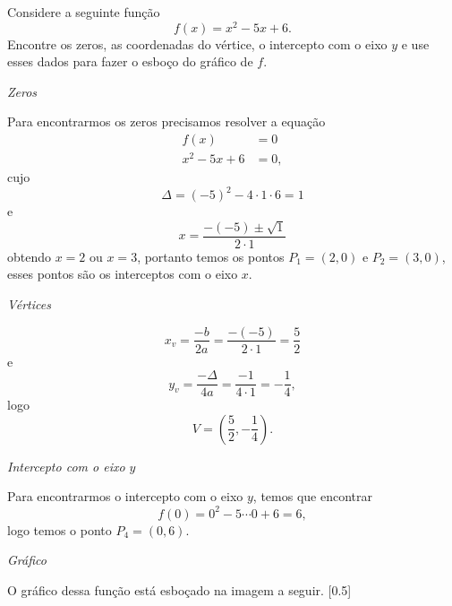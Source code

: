 \begin{example}
  Considere a seguinte função
  \[
    f(x)=x^2-5x+6.
  \]
  Encontre os zeros, as coordenadas do vértice, o intercepto com o eixo $y$
  e use esses dados para fazer o esboço do gráfico de $f$.

  \solution
  \emph{Zeros}

  Para encontrarmos os zeros precisamos resolver a equação
  \begin{align*}
    f(x) & =0 \\
    x^2-5x+6 & = 0,
  \end{align*}
  cujo
  \[
    \Delta = (-5)^2 - 4 \cdot 1 \cdot 6 = 1
  \]
  e
  \[
    x = \frac{-(-5) \pm \sqrt{1}}{2 \cdot 1}
  \]
  obtendo $x=2$ ou $x=3$, portanto temos os pontos $P_1=(2, 0)$ e
  $P_2=(3, 0)$, esses pontos são os interceptos com o eixo $x$.

  \emph{Vértices}

  \[
    x_v
    = \frac{-b}{2a}
    = \frac{-(-5)}{2 \cdot 1}
    = \frac{5}{2}
  \]
  e
  \[
    y_v
    = \frac{-\Delta}{4a}
    = \frac{-1}{4 \cdot 1}
    = -\frac{1}{4},
  \]
  logo
  \[
    V=\left(\frac{5}{2}, -\frac{1}{4}\right).
  \]

  \emph{Intercepto com o eixo $y$}

  Para encontrarmos o intercepto com o eixo $y$, temos que encontrar
  \[
    f(0) = 0^2 - 5 \cdots 0 + 6 = 6,
  \]
  logo temos o ponto $P_4=(0, 6)$.

  \emph{Gráfico}

  O gráfico dessa função está esboçado na imagem a seguir.
  [0.5]
\end{example}

